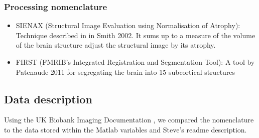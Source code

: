 \documentclass{article}
\begin{document}
\subsubsection{Processing nomenclature}
\begin{itemize}
\item SIENAX (Structural Image Evaluation using Normalisation of Atrophy): Technique described in in Smith 2002. It sums up to a measure of the volume of the brain structure adjust the structural image by its atrophy.
  \item FIRST (FMRIB's Integrated Registration and Segmentation Tool): A tool by Patenaude 2011 for segregating the brain into 15 subcortical structures
\end{itemize}

\subsection{Data description\label{data}}

Using the UK Biobank Imaging Documentation \cite{Smith2016}, we compared the nomenclature to the data stored within the Matlab variables and Steve's readme description.
\end{document}
